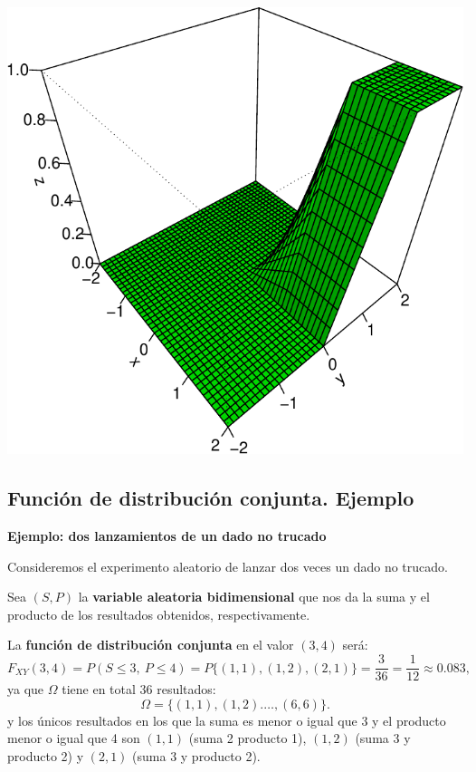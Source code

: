\documentclass[]{book}
\begin{document}
\begin{center}\includegraphics{curso-probabilidad-udemy_files/figure-latex/unnamed-chunk-118-1} \end{center}

\hypertarget{funciuxf3n-de-distribuciuxf3n-conjunta.-ejemplo-4}{%
\subsection{Función de distribución conjunta. Ejemplo}\label{funciuxf3n-de-distribuciuxf3n-conjunta.-ejemplo-4}}

\textbf{Ejemplo: dos lanzamientos de un dado no trucado}

Consideremos el experimento aleatorio de lanzar dos veces un dado no trucado.

Sea \((S,P)\) la \textbf{variable aleatoria bidimensional} que nos da la suma y el producto de los resultados obtenidos, respectivamente.

La \textbf{función de distribución conjunta} en el valor \((3,4)\) será:
\[
F_{XY}(3,4) = P(S\leq 3,\ P\leq 4)=P\{(1,1), (1,2), (2,1) \}=\frac{3}{36}=\frac{1}{12}\approx 0.083, 
\]
ya que \(\Omega\) tiene en total \(36\) resultados:
\[
\Omega =\{(1,1),(1,2).\ldots, (6,6)\}.
\]
y los únicos resultados en los que la suma es menor o igual que 3 y el producto menor o igual que 4 son \((1,1)\) (suma 2 producto 1), \((1,2)\) (suma 3 y producto 2) y \((2,1)\) (suma 3 y producto 2).
\end{document}
